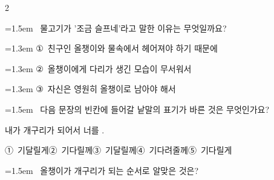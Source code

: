 \documentclass[12pt, a4paper]{article}
\begin{document}
\begin{multicols}{2}
\noindent\begin{minipage}{\columnwidth}
\vspace{2mm}
{\hangindent=1.5em  ~물고기가 '조금 슬프네'라고 말한 이유는 무엇일까요?\par}

\vspace{0.5mm}
{\hangindent=1.3em  \noindent\hspace{0.3em}①~친구인 올챙이와 물속에서 헤어져야 하기 때문에\par}
{\hangindent=1.3em  \noindent\hspace{0.3em}②~올챙이에게 다리가 생긴 모습이 무서워서\par}
{\hangindent=1.3em  \noindent\hspace{0.3em}③~자신은 영원히 올챙이로 남아야 해서\par}
\vspace{4mm}
\end{minipage}
\par

\noindent\begin{minipage}{\columnwidth}
\vspace{2mm}
{\hangindent=1.5em  ~다음 문장의 빈칸에 들어갈 낱말의 표기가 바른 것은 무엇인가요?\par}

\vspace{1mm}
\begin{boxibox}
내가 개구리가 되어서 너를 \underline{\hspace{3cm}}. \\
\end{boxibox}
\vspace{1mm}

\vspace{0.5mm}
\noindent
\mbox{①~기달릴게}\hspace{1em}\mbox{②~기다릴께}\hspace{1em}\mbox{③~기달릴께}\hspace{1em}\mbox{④~기다려줄께}\hspace{1em}\mbox{⑤~기다릴게}

\vspace{4mm}
\end{minipage}
\par

\noindent\begin{minipage}{\columnwidth}
\vspace{2mm}
{\hangindent=1.5em  ~올챙이가 개구리가 되는 순서로 알맞은 것은?\par}


\end{minipage}
\end{multicols}
\end{document}
